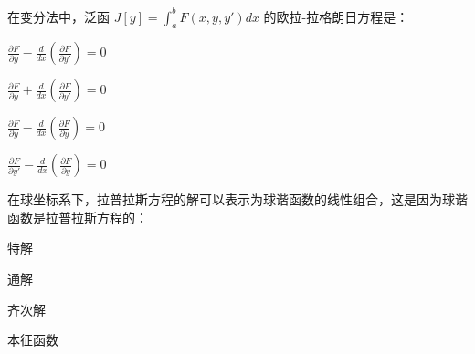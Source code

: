 \documentclass{njustexam}
\begin{document}





\begin{problem}
  在变分法中，泛函 $J[y] = \int_{a}^{b} F(x, y, y') dx$ 的欧拉-拉格朗日方程是：
  \begin{abcd}
  \item $\frac{\partial F}{\partial y} - \frac{d}{dx} \left( \frac{\partial F}{\partial y'} \right) = 0$
  \item $\frac{\partial F}{\partial y} + \frac{d}{dx} \left( \frac{\partial F}{\partial y'} \right) = 0$
  \item $\frac{\partial F}{\partial y} - \frac{d}{dx} \left( \frac{\partial F}{\partial y} \right) = 0$
  \item $\frac{\partial F}{\partial y'} - \frac{d}{dx} \left( \frac{\partial F}{\partial y} \right) = 0$
  \end{abcd}
  \end{problem}



   
    \begin{problem}
      在球坐标系下，拉普拉斯方程的解可以表示为球谐函数的线性组合，这是因为球谐函数是拉普拉斯方程的：
      \begin{abcd}
      \item 特解
      \item 通解
      \item 齐次解
      \item 本征函数
      \end{abcd}
      \end{problem}
\end{document}
